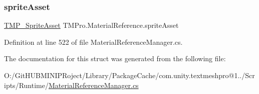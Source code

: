 \subsubsection{\texorpdfstring{spriteAsset}{spriteAsset}}
{\footnotesize\ttfamily \mbox{\hyperlink{class_t_m_pro_1_1_t_m_p___sprite_asset}{T\+M\+P\+\_\+\+Sprite\+Asset}} T\+M\+Pro.\+Material\+Reference.\+sprite\+Asset}



Definition at line 522 of file Material\+Reference\+Manager.\+cs.



The documentation for this struct was generated from the following file\+:\begin{DoxyCompactItemize}
\item 
O\+:/\+Git\+H\+U\+B\+M\+I\+N\+I\+P\+Roject/\+Library/\+Package\+Cache/com.\+unity.\+textmeshpro@1../\+Scripts/\+Runtime/\mbox{\hyperlink{_material_reference_manager_8cs}{Material\+Reference\+Manager.\+cs}}\end{DoxyCompactItemize}
